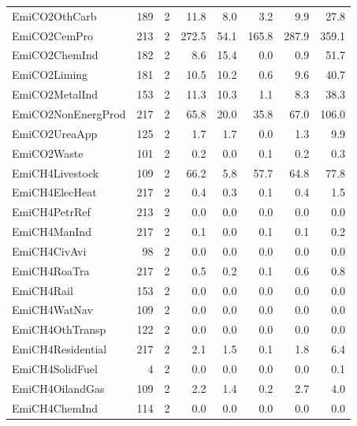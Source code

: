 {\begin{tabular}[t]{lrrrrrrr}
EmiCO2OthCarb & 189 & 2 & \num{11.8} & \num{8.0} & \num{3.2} & \num{9.9} & \num{27.8}\\
EmiCO2CemPro & 213 & 2 & \num{272.5} & \num{54.1} & \num{165.8} & \num{287.9} & \num{359.1}\\
EmiCO2ChemInd & 182 & 2 & \num{8.6} & \num{15.4} & \num{0.0} & \num{0.9} & \num{51.7}\\
EmiCO2Liming & 181 & 2 & \num{10.5} & \num{10.2} & \num{0.6} & \num{9.6} & \num{40.7}\\
EmiCO2MetalInd & 153 & 2 & \num{11.3} & \num{10.3} & \num{1.1} & \num{8.3} & \num{38.3}\\
EmiCO2NonEnergProd & 217 & 2 & \num{65.8} & \num{20.0} & \num{35.8} & \num{67.0} & \num{106.0}\\
EmiCO2UreaApp & 125 & 2 & \num{1.7} & \num{1.7} & \num{0.0} & \num{1.3} & \num{9.9}\\
EmiCO2Waste & 101 & 2 & \num{0.2} & \num{0.0} & \num{0.1} & \num{0.2} & \num{0.3}\\
EmiCH4Livestock & 109 & 2 & \num{66.2} & \num{5.8} & \num{57.7} & \num{64.8} & \num{77.8}\\
EmiCH4ElecHeat & 217 & 2 & \num{0.4} & \num{0.3} & \num{0.1} & \num{0.4} & \num{1.5}\\
EmiCH4PetrRef & 213 & 2 & \num{0.0} & \num{0.0} & \num{0.0} & \num{0.0} & \num{0.0}\\
EmiCH4ManInd & 217 & 2 & \num{0.1} & \num{0.0} & \num{0.1} & \num{0.1} & \num{0.2}\\
EmiCH4CivAvi & 98 & 2 & \num{0.0} & \num{0.0} & \num{0.0} & \num{0.0} & \num{0.0}\\
EmiCH4RoaTra & 217 & 2 & \num{0.5} & \num{0.2} & \num{0.1} & \num{0.6} & \num{0.8}\\
EmiCH4Rail & 153 & 2 & \num{0.0} & \num{0.0} & \num{0.0} & \num{0.0} & \num{0.0}\\
EmiCH4WatNav & 109 & 2 & \num{0.0} & \num{0.0} & \num{0.0} & \num{0.0} & \num{0.0}\\
EmiCH4OthTransp & 122 & 2 & \num{0.0} & \num{0.0} & \num{0.0} & \num{0.0} & \num{0.0}\\
EmiCH4Residential & 217 & 2 & \num{2.1} & \num{1.5} & \num{0.1} & \num{1.8} & \num{6.4}\\
EmiCH4SolidFuel & 4 & 2 & \num{0.0} & \num{0.0} & \num{0.0} & \num{0.0} & \num{0.1}\\
EmiCH4OilandGas & 109 & 2 & \num{2.2} & \num{1.4} & \num{0.2} & \num{2.7} & \num{4.0}\\
EmiCH4ChemInd & 114 & 2 & \num{0.0} & \num{0.0} & \num{0.0} & \num{0.0} & \num{0.0}\\

\end{tabular}}
